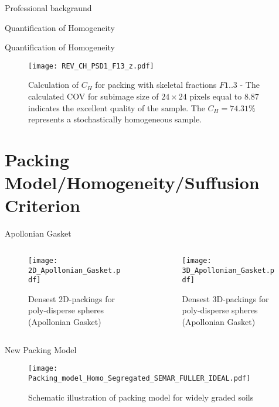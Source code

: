 \documentclass[10pt,xcolor=dvipsnames]{beamer}
\begin{document}
{\begin{frame}{Professional backgraund}
{\begin{frame}{Quantification of Homogeneity}
\end{frame}
}


\begin{frame}{Quantification of Homogeneity}
	
\begin{figure}[H]
   \centering
\texttt{[image: REV\_CH\_PSD1\_F13\_z.pdf]} 
        \caption{Calculation of $C_{H}$ for packing with skeletal fractions $F1..3$ - The calculated COV for subimage size of $24\times24$ pixels equal to \num{8.87} indicates the excellent quality of the sample. The $C_{H}=74.31\%$ represents a stochastically homogeneous sample.}
        \label{fig:Homogeneity_calc_DEM_Section}
\end{figure}
\end{frame}

\section{Packing Model/Homogeneity/Suffusion Criterion}

\begin{frame}{Apollonian Gasket}
\begin{columns}
\begin{column}{0.49\textwidth}
\vspace{0.25cm}
\begin{figure}
  \centering
  \texttt{[image: 2D\_Apollonian\_Gasket.pdf]}
	\vspace{0.2cm}
	\caption{Densest 2D-packings for poly-disperse spheres (Apollonian Gasket)}
	\end{figure}
\end{column}%
\begin{column}{0.49\textwidth}
\begin{figure}
  \centering
\texttt{[image: 3D\_Apollonian\_Gasket.pdf]}
\caption{Densest 3D-packings for poly-disperse spheres (Apollonian Gasket)} 
\end{figure}
\end{column}
\end{columns}
        
\end{frame}


{
\usenavigationsymbolstemplate{}
\begin{frame}{New Packing Model}
	\begin{figure}[H]
\centering
\texttt{[image: Packing\_model\_Homo\_Segregated\_SEMAR\_FULLER\_IDEAL.pdf]}
\vspace{-0.4cm} 
        \caption{Schematic illustration of packing model for widely graded soils}
        \label{fig:segregated_packing_model}
\end{figure}
\end{frame}
}


\end{frame}}
\end{document}
